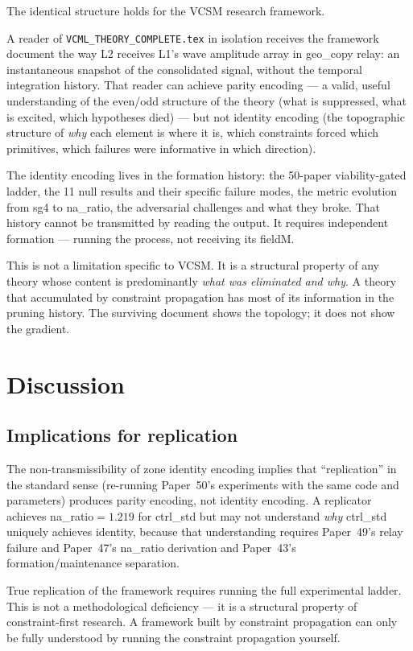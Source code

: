 \documentclass[11pt,a4paper]{article}
\begin{document}
The identical structure holds for the VCSM research framework.

A reader of \texttt{VCML\_THEORY\_COMPLETE.tex} in isolation receives the
framework document the way L2 receives L1's wave amplitude array in geo\_copy relay:
an instantaneous snapshot of the consolidated signal, without the temporal
integration history.
That reader can achieve parity encoding --- a valid, useful understanding
of the even/odd structure of the theory (what is suppressed, what is excited,
which hypotheses died) --- but not identity encoding (the topographic structure
of \emph{why} each element is where it is, which constraints forced which primitives,
which failures were informative in which direction).

The identity encoding lives in the formation history: the 50-paper viability-gated
ladder, the 11 null results and their specific failure modes, the metric evolution
from sg4 to na\_ratio, the adversarial challenges and what they broke.
That history cannot be transmitted by reading the output.
It requires independent formation --- running the process, not receiving its fieldM.

This is not a limitation specific to VCSM.
It is a structural property of any theory whose content is predominantly
\emph{what was eliminated and why}.
A theory that accumulated by constraint propagation has most of its information
in the pruning history.
The surviving document shows the topology; it does not show the gradient.

\section{Discussion}

\subsection{Implications for replication}

The non-transmissibility of zone identity encoding implies that
``replication'' in the standard sense (re-running Paper~50's experiments
with the same code and parameters) produces parity encoding, not identity encoding.
A replicator achieves na\_ratio$=1.219$ for ctrl\_std but may not understand
\emph{why} ctrl\_std uniquely achieves identity, because that understanding
requires Paper~49's relay failure and Paper~47's na\_ratio derivation
and Paper~43's formation/maintenance separation.

True replication of the framework requires running the full experimental ladder.
This is not a methodological deficiency --- it is a structural property of
constraint-first research.
A framework built by constraint propagation can only be fully understood by
running the constraint propagation yourself.
\end{document}
